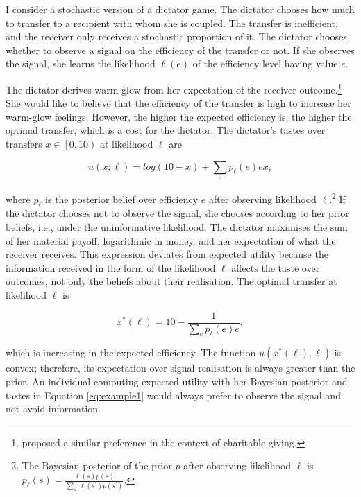 I consider a stochastic version of a dictator game. The dictator chooses how much to transfer to a recipient with whom she is coupled. The transfer is inefficient, and the receiver only receives a stochastic proportion of it. The dictator chooses whether to observe a signal on the efficiency of the transfer or not. If she observes the signal, she learns the likelihood \( \ell \left( e \right) \) of the efficiency level having value \( e \).

The dictator derives warm-glow from her expectation of the receiver outcome.\footnote{\cite{niehausTheoryGoodIntentions2014} proposed a similar preference in the context of charitable giving.} She would like to believe that the efficiency of the transfer is high to increase her warm-glow feelings. However, the higher the expected efficiency is, the higher the optimal transfer, which is a cost for the dictator. The dictator's tastes over transfers \( x \in \left[0, 10 \right) \) at likelihood \( \ell \) are

\begin{equation}\label{eq:example1}
	u \left( x ; \ell \right) = log \left( 10 - x \right) + \sum_{e} p_{\ell} \left( e \right) e x ,
\end{equation}

where \( p_{\ell} \) is the posterior belief over efficiency \( e \) after observing likelihood \( \ell \).\footnote{The Bayesian posterior of the prior \( p \) after observing likelihood \( \ell \) is \( p_{\ell} \left( s \right) = \frac{\ell \left( s \right) p \left( s \right)}{\sum_{s^{\prime}} \ell \left( s^{\prime} \right) p \left( s^{\prime} \right)} \).} If the dictator chooses not to observe the signal, she chooses according to her prior beliefs, i.e., under the uninformative likelihood. The dictator maximises the sum of her material payoff, logarithmic in money, and her expectation of what the receiver receives. This expression deviates from expected utility because the information received in the form of the likelihood \( \ell \) affects the taste over outcomes, not only the beliefs about their realisation. The optimal transfer at likelihood \( \ell \) is

\[
	x^{*} \left( \ell \right) = 10 - \frac{1}{\sum_{e} p_{\ell} \left( e \right) e } ,
\]

which is increasing in the expected efficiency. The function \( u \left( x^{*} \left( \ell \right), \ell \right) \) is convex; therefore, its expectation over signal realisation is always greater than the prior. An individual computing expected utility with her Bayesian posterior and tastes in Equation \eqref{eq:example1} would always prefer to observe the signal and not avoid information.

